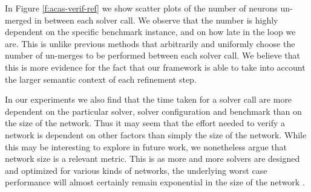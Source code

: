 In Figure \ref{f:acas-verif-ref} we show scatter plots of the number of neurons
un-merged in between each solver call. We observe that the number is highly
dependent on the specific benchmark instance,
and on how late in the \cegar loop we are. This is unlike previous methods
that arbitrarily and uniformly choose the number of un-merges
\cite{cegar-nn} to be performed between each solver call. We believe
that this is more evidence for the fact that our framework is able to take into
account the larger semantic context of each refinement step. 

In our experiments we also find that the time taken for a solver call are more
dependent on the particular solver, solver configuration and benchmark than on
the size of the network. Thus it may seem that the effort needed to verify a
network is dependent on other factors than simply the size of the network. While
this may be interesting to explore in future work, we nonetheless argue that
network size is a relevant metric. This is as more and more solvers are designed
and optimized for various kinds of networks, the underlying worst case
performance will almost certainly remain exponential in the size of the network
\cite{reluplex}.

